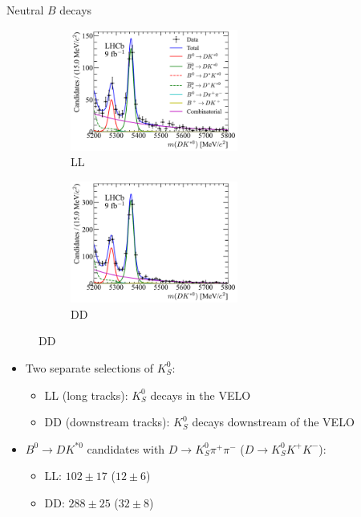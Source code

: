 \documentclass[xcolor={dvipsnames}]{beamer}
\begin{document}
\begin{frame}{Neutral $B$ decays}
  \begin{figure}
    \begin{subfigure}{0.45\textwidth}
      \includegraphics[height = 4.0cm]{Plots/Kspp_LL_GF_B0toDKst.pdf}
      \caption*{LL}
    \end{subfigure}%
    \begin{subfigure}{0.45\textwidth}
      \includegraphics[height = 4.0cm]{Plots/Kspp_DD_GF_B0toDKst.pdf}
      \caption*{DD}
    \end{subfigure}
  \end{figure}
  \vspace{-0.5cm}
  \begin{itemize}
    \setlength\itemsep{0.5em}
    \item{Two separate selections of $K^0_S$:}
    \begin{itemize}
      \item{LL (long tracks): $K^0_S$ decays in the VELO}
      \item{DD (downstream tracks): $K^0_S$ decays downstream of the VELO}
    \end{itemize}
    \item{$B^0\to DK^{*0}$ candidates with $D\to K_S^0\pi^+\pi^-$ ($D\to K_S^0K^+K^-$):}
    \begin{itemize}
      \item{LL: $102 \pm 17$ ($12 \pm 6$)}
      \item{DD: $288 \pm 25$ ($32 \pm 8$)}
    \end{itemize}
  \end{itemize}
\end{frame}
\end{document}
